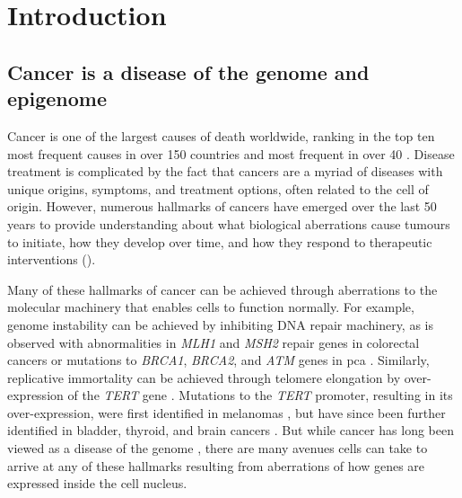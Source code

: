 \chapter{Introduction}
\label{chap:intro}

\section{Cancer is a disease of the genome and epigenome}

Cancer is one of the largest causes of death worldwide, ranking in the top ten most frequent causes in over 150 countries and most frequent in over 40 \cite{brayGlobalCancerStatistics2018}.
Disease treatment is complicated by the fact that cancers are a myriad of diseases with unique origins, symptoms, and treatment options, often related to the cell of origin.
However, numerous hallmarks of cancers have emerged over the last 50 years to provide understanding about what biological aberrations cause tumours to initiate, how they develop over time, and how they respond to therapeutic interventions \cite{hanahanHallmarksCancer2000,hanahanHallmarksCancerNext2011,flavahanEpigeneticPlasticityHallmarks2017,pavlovaEmergingHallmarksCancer2016} ().


Many of these hallmarks of cancer can be achieved through aberrations to the molecular machinery that enables cells to function normally.
For example, genome instability can be achieved by inhibiting DNA repair machinery, as is observed with abnormalities in \emph{MLH1} and \emph{MSH2} repair genes in colorectal cancers \cite{lengauerGeneticInstabilitiesHuman1998} or mutations to \emph{BRCA1}, \emph{BRCA2}, and \emph{ATM} genes in \gls{pca} \cite{abeshouseMolecularTaxonomyPrimary2015}.
Similarly, replicative immortality can be achieved through telomere elongation by over-expression of the \emph{TERT} gene \cite{vinagreFrequencyTERTPromoter2013}.
Mutations to the \emph{TERT} promoter, resulting in its over-expression, were first identified in melanomas \cite{huangHighlyRecurrentTERT2013,hornTERTPromoterMutations2013}, but have since been further identified in bladder, thyroid, and brain cancers \cite{vinagreFrequencyTERTPromoter2013,nagarajanRecurrentEpimutationsActivate2014,sternMutationTERTPromoter2015}.
But while cancer has long been viewed as a disease of the genome \cite{hanahanHallmarksCancer2000}, there are many avenues cells can take to arrive at any of these hallmarks resulting from aberrations of how genes are expressed inside the cell nucleus.

